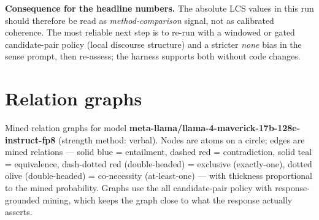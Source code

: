 \documentclass[11pt]{article}
\begin{document}
\textbf{Consequence for the headline numbers.} The absolute LCS values in this run should therefore be read as \emph{method-comparison} signal, not as calibrated coherence. The most reliable next step is to re-run with a windowed or gated candidate-pair policy (local discourse structure) and a stricter \emph{none} bias in the sense prompt, then re-assess; the harness supports both without code changes.

\section{Relation graphs}\label{sec:graphs}

Mined relation graphs for model \textbf{meta-llama/llama-4-maverick-17b-128e-instruct-fp8} (strength method: verbal). Nodes are atoms on a circle; edges are mined relations --- solid blue = entailment, dashed red = contradiction, solid teal = equivalence, dash-dotted red (double-headed) = exclusive (exactly-one), dotted olive (double-headed) = co-necessity (at-least-one) --- with thickness proportional to the mined probability. Graphs use the all candidate-pair policy with response-grounded mining, which keeps the graph close to what the response actually asserts.
\end{document}
